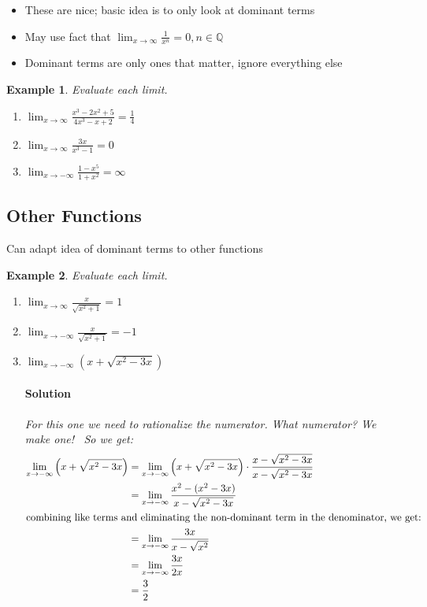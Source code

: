 \documentclass[letterpaper, 11pt, openany]{book}
\theoremstyle{mytheoremstyle}
\theoremstyle{myexamplestyle}
\newtheorem{example}{Example}[section]
\newenvironment{solution}{\paragraph{\sffamily \smaller \fontseries{b}\selectfont Solution}}{\hfill\faSquare}
\begin{document}
\begin{itemize}
    \item These are nice; basic idea is to only look at dominant terms
    \item May use fact that \(\displaystyle \lim_{x \to \infty} \frac{1}{x^{n}} = 0, n \in \mathbb{Q}\)
    \item Dominant terms are only ones that matter, ignore everything else
\end{itemize}
\begin{example}\label{e:lim-at-inf-rational}
    Evaluate each limit.
    \begin{enumerate}
        \item \(\displaystyle \lim_{x \to \infty} \frac{x^{3} - 2x^{2} + 5}{4 x^{3}- x + 2} = \frac{1}{4}\)
        \item \(\displaystyle \lim_{x \to \infty} \frac{3x}{x^{3} - 1} = 0\)
        \item \(\displaystyle \lim_{x \to -\infty} \frac{1-x^{5}}{1+ x^{2}} = \infty\)
    \end{enumerate}
\end{example}

\subsection{Other Functions}
Can adapt idea of dominant terms to other functions
\begin{example}\label{e:lim-at-inf-algebraic}
    Evaluate each limit.
    \begin{enumerate}
        \item \(\displaystyle \lim_{x \to \infty} \frac{x}{\sqrt{x^{2} + 1}} = 1\)
        \item \(\displaystyle \lim_{x \to -\infty} \frac{x}{\sqrt{x^{2} + 1}} = -1\)
        \item  \(\displaystyle \lim_{x \to -\infty} \left(x + \sqrt{x^{2} - 3x}\right)\)
        \begin{solution}
            For this one we need to rationalize the numerator. What numerator? We make one! \faSmile \, So we get:
            \begin{align*}
                \lim_{x \to -\infty} \left(x + \sqrt{x^{2} - 3x}\right) &= \lim_{x \to -\infty} \left(x + \sqrt{x^{2} - 3x}\right) \cdot \frac{x - \sqrt{x^{2} - 3x}}{x - \sqrt{x^{2} - 3x}} \\
                                                                &= \lim_{x \to -\infty} \frac{x^{2} - (x^{2} - 3x)}{x - \sqrt{x^{2} - 3x}}\\
                \intertext{combining like terms and eliminating the non-dominant term in the denominator, we get:}
                                                                &= \lim_{x \to -\infty} \frac{3x}{x - \sqrt{x^{2}}}\\
                                                                &= \lim_{x \to -\infty} \frac{3x}{2x}\\
                                                                &= \frac{3}{2}
            \end{align*}
        \end{solution}
    \end{enumerate}
\end{example}
\end{document}
